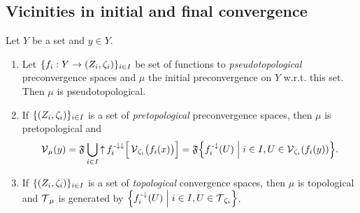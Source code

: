 \subsection{Vicinities in initial and final convergence}
\begin{proposition} \label{pretopologicalInitialConvergence}
Let $Y$ be a set and $y\in Y$.
\begin{enumerate}
\item Let $\{f_i: Y\to \left( Z_i, \zeta_i \right)\}_{i\in I}$ be set of functions to \emph{pseudotopological} preconvergence spaces and $\mu$ the initial preconvergence on $Y$ w.r.t. this set. Then $\mu$ is pseudotopological.
\item If $\{\left( Z_i, \zeta_i \right)\}_{i\in I}$ is a set of \emph{pretopological} preconvergence spaces, then $\mu$ is pretopological and
\[ \vicinity_\mu(y) = \mathfrak{F}\bigcup_{i\in I} \upset f_i^{\preimf\imf}\Big[\vicinity_{\zeta_i}\!\big(f_i(x)\big)\Big] = \mathfrak{F}\setbuilder{f_i^\preimf(U)}{i\in I, U\in \vicinity_{\zeta_i}(f_i(y))}. \]
\item If $\{\left( Z_i, \zeta_i \right)\}_{i\in I}$ is a set of \emph{topological} convergence spaces, then $\mu$ is topological and $\operatorname{\mathcal{T}}_\mu$ is generated by $\setbuilder{f_i^\preimf(U)}{i\in I, U\in \topology_{\zeta_i}}$.
\end{enumerate}
\end{proposition}
